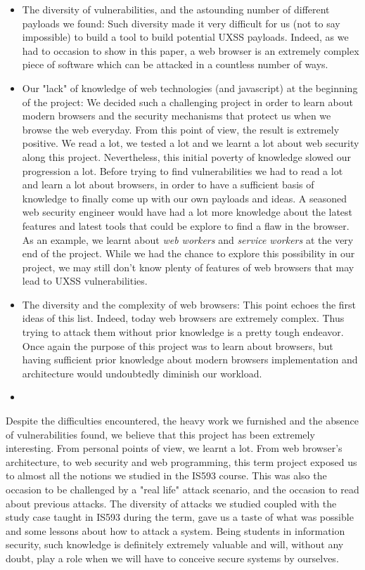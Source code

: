 \documentclass[journal]{IEEEtran}
\begin{document}
\begin{itemize}
\item The diversity of vulnerabilities, and the astounding number of different payloads we found: Such diversity made it very difficult for us (not to say impossible) to build a tool to build potential UXSS payloads. Indeed, as we had to occasion to show in this paper, a web browser is an extremely complex piece of software which can be attacked in a countless number of ways.
\item Our "lack" of knowledge of web technologies (and javascript) at the beginning of the project: We decided such a challenging project in order to learn about modern browsers and the security mechanisms that protect us when we browse the web everyday. From this point of view, the result is extremely positive. We read a lot, we tested a lot and we learnt a lot about web security along this project. Nevertheless, this initial poverty of knowledge slowed our progression a lot. Before trying to find vulnerabilities we had to read a lot and learn a lot about browsers, in order to have a sufficient basis of knowledge to finally come up with our own payloads and ideas. A seasoned web security engineer would have had a lot more knowledge about the latest features and latest tools that could be explore to find a flaw in the browser. As an example, we learnt about \emph{web workers} and \emph{service workers} at the very end of the project. While we had the chance to explore this possibility in our project, we may still don't know plenty of features of web browsers that may lead to UXSS vulnerabilities.
\item The diversity and the complexity of web browsers: This point echoes the first ideas of this list. Indeed, today web browsers are extremely complex. Thus trying to attack them without prior knowledge is a pretty tough endeavor. Once again the purpose of this project was to learn about browsers, but having sufficient prior knowledge about modern browsers implementation and architecture would undoubtedly diminish our workload.
\item
\end{itemize}

\medskip

Despite the difficulties encountered, the heavy work we furnished and the absence of vulnerabilities found, we believe that this project has been extremely interesting. From personal points of view, we learnt a lot. From web browser's architecture, to web security and web programming, this term project exposed us to almost all the notions we studied in the IS593 course. This was also the occasion to be challenged by a "real life" attack scenario, and the occasion to read about previous attacks. The diversity of attacks we studied coupled with the study case taught in IS593 during the term, gave us a taste of what was possible and some lessons about how to attack a system. Being students in information security, such knowledge is definitely extremely valuable and will, without any doubt, play a role when we will have to conceive secure systems by ourselves.
\end{document}
